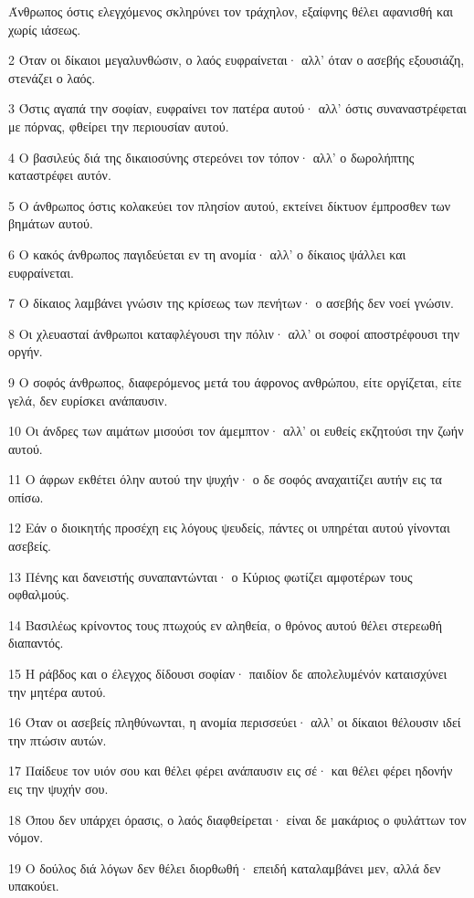 \par Άνθρωπος όστις ελεγχόμενος σκληρύνει τον τράχηλον, εξαίφνης θέλει αφανισθή και χωρίς ιάσεως.
\par 2 Όταν οι δίκαιοι μεγαλυνθώσιν, ο λαός ευφραίνεται· αλλ' όταν ο ασεβής εξουσιάζη, στενάζει ο λαός.
\par 3 Όστις αγαπά την σοφίαν, ευφραίνει τον πατέρα αυτού· αλλ' όστις συναναστρέφεται με πόρνας, φθείρει την περιουσίαν αυτού.
\par 4 Ο βασιλεύς διά της δικαιοσύνης στερεόνει τον τόπον· αλλ' ο δωρολήπτης καταστρέφει αυτόν.
\par 5 Ο άνθρωπος όστις κολακεύει τον πλησίον αυτού, εκτείνει δίκτυον έμπροσθεν των βημάτων αυτού.
\par 6 Ο κακός άνθρωπος παγιδεύεται εν τη ανομία· αλλ' ο δίκαιος ψάλλει και ευφραίνεται.
\par 7 Ο δίκαιος λαμβάνει γνώσιν της κρίσεως των πενήτων· ο ασεβής δεν νοεί γνώσιν.
\par 8 Οι χλευασταί άνθρωποι καταφλέγουσι την πόλιν· αλλ' οι σοφοί αποστρέφουσι την οργήν.
\par 9 Ο σοφός άνθρωπος, διαφερόμενος μετά του άφρονος ανθρώπου, είτε οργίζεται, είτε γελά, δεν ευρίσκει ανάπαυσιν.
\par 10 Οι άνδρες των αιμάτων μισούσι τον άμεμπτον· αλλ' οι ευθείς εκζητούσι την ζωήν αυτού.
\par 11 Ο άφρων εκθέτει όλην αυτού την ψυχήν· ο δε σοφός αναχαιτίζει αυτήν εις τα οπίσω.
\par 12 Εάν ο διοικητής προσέχη εις λόγους ψευδείς, πάντες οι υπηρέται αυτού γίνονται ασεβείς.
\par 13 Πένης και δανειστής συναπαντώνται· ο Κύριος φωτίζει αμφοτέρων τους οφθαλμούς.
\par 14 Βασιλέως κρίνοντος τους πτωχούς εν αληθεία, ο θρόνος αυτού θέλει στερεωθή διαπαντός.
\par 15 Η ράβδος και ο έλεγχος δίδουσι σοφίαν· παιδίον δε απολελυμένόν καταισχύνει την μητέρα αυτού.
\par 16 Όταν οι ασεβείς πληθύνωνται, η ανομία περισσεύει· αλλ' οι δίκαιοι θέλουσιν ιδεί την πτώσιν αυτών.
\par 17 Παίδευε τον υιόν σου και θέλει φέρει ανάπαυσιν εις σέ· και θέλει φέρει ηδονήν εις την ψυχήν σου.
\par 18 Όπου δεν υπάρχει όρασις, ο λαός διαφθείρεται· είναι δε μακάριος ο φυλάττων τον νόμον.
\par 19 Ο δούλος διά λόγων δεν θέλει διορθωθή· επειδή καταλαμβάνει μεν, αλλά δεν υπακούει.
